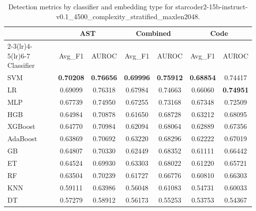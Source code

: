 \begin{table}[t]
\centering
\caption{Detection metrics by classifier and embedding type for starcoder2-15b-instruct-v0.1\_4500\_complexity\_stratified\_maxlen2048.}
\label{tab:rq2d_starcoder2-15b-instruct-v0.1_4500_complexity_stratified_maxlen2048}
\begin{tabular}{l cc cc cc}
\toprule
 & \multicolumn{2}{c}{AST} & \multicolumn{2}{c}{Combined} & \multicolumn{2}{c}{Code} \\
\cmidrule(lr){2-3}\cmidrule(lr){4-5}\cmidrule(lr){6-7}
Classifier & Avg\_F1 & AUROC & Avg\_F1 & AUROC & Avg\_F1 & AUROC \\
\midrule
SVM & \textbf{0.70208} & \textbf{0.76656} & \textbf{0.69996} & \textbf{0.75912} & \textbf{0.68854} & 0.74417 \\
LR & 0.69099 & 0.76318 & 0.67984 & 0.74663 & 0.66060 & \textbf{0.74951} \\
MLP & 0.67739 & 0.74950 & 0.67255 & 0.73168 & 0.67348 & 0.72509 \\
HGB & 0.64984 & 0.70878 & 0.61650 & 0.68728 & 0.63212 & 0.68095 \\
XGBoost & 0.64770 & 0.70984 & 0.62094 & 0.68064 & 0.62889 & 0.67356 \\
AdaBoost & 0.63869 & 0.70692 & 0.63220 & 0.68296 & 0.62222 & 0.67019 \\
GB & 0.64807 & 0.70330 & 0.62449 & 0.68352 & 0.61111 & 0.66442 \\
ET & 0.64524 & 0.69930 & 0.63303 & 0.68022 & 0.61220 & 0.65721 \\
RF & 0.63504 & 0.70239 & 0.61727 & 0.66776 & 0.60810 & 0.66303 \\
KNN & 0.59111 & 0.63986 & 0.56048 & 0.61083 & 0.54731 & 0.60033 \\
DT & 0.57279 & 0.58912 & 0.56173 & 0.55253 & 0.53753 & 0.54367 \\
\bottomrule
\end{tabular}
\end{table}
